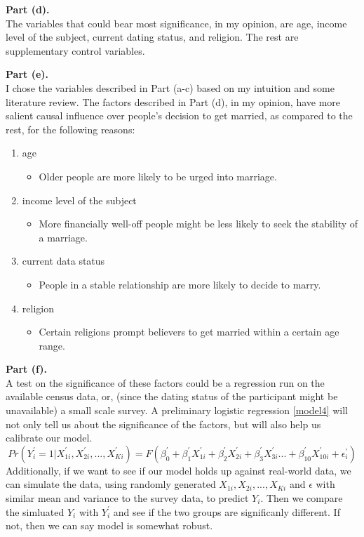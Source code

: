 \documentclass[letterpaper,12pt]{article}
\theoremstyle{definition}
\begin{document}
\textbf{Part (d).} \\
The variables that could bear most significance, in my opinion, are age, income level of the subject, current dating status, and religion. The rest are supplementary control variables.

\textbf{Part (e).} \\
I chose the variables described in Part (a-c) based on my intuition and some literature review. The factors described in Part (d), in my opinion, have more salient causal influence over people's decision to get married, as compared to the rest, for the following reasons:

\begin{enumerate}
	\item age
	\begin{itemize}
		\item Older people are more likely to be urged into marriage.
	\end{itemize}
	\item income level of the subject
	\begin{itemize}
		\item More financially well-off people might be less likely to seek the stability of a marriage.
	\end{itemize}
	\item current data status
	\begin{itemize}
		\item People in a stable relationship are more likely to decide to marry.
	\end{itemize}
	\item religion
	\begin{itemize}
		\item Certain religions prompt believers to get married within a certain age range. 
	\end{itemize}
\end{enumerate}


\textbf{Part (f).} \\
A test on the significance of these factors could be a regression run on the available census data, or, (since the dating status of the participant might be unavailable) a small scale survey. A preliminary logistic regression \eqref{model4} will not only tell us about the significance of the factors, but will also help us calibrate our model. 
\begin{equation} \label{model4}
Pr(Y_i^{'}=1|X_{1i}^{'}, X_{2i}^{'}, ..., X_{Ki}^{'}) = F(\beta_0^{'}+\beta_1^{'} X_{1i}^{'}+\beta_{2}^{'} X_{2i}^{'}+ \beta_{3}^{'} X_{3i}^{'} ... + \beta_{10}^{'} X_{10i}^{'} + \epsilon_i^{'})
\end{equation}
Additionally, if we want to see if our model holds up against real-world data, we can simulate the data, using randomly generated $X_{1i}, X_{2i}, ..., X_{Ki}$ and $\epsilon$ with similar mean and variance to the survey data, to predict $Y_i$. Then we compare the simluated $Y_i$ with $Y_i^{'}$ and see if the two groups are significanly different. If not, then we can say model is somewhat robust.
\end{document}
